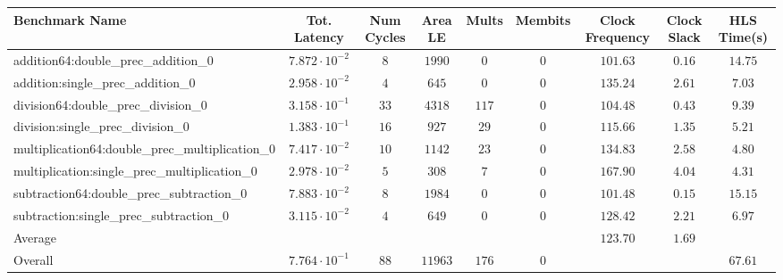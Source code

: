 \begin{tabular}{|l|c|c|c|c|c|c|c|c|}
\hline
Benchmark Name                                   & Tot. Latency            & Num Cycles & Area LE   & Mults   & Membits & Clock Frequency & Clock Slack & HLS Time(s) \\
\hline
addition64:double\_prec\_addition\_0             & $ 7.872 \cdot 10^{-2} $ & $ 8      $ & $ 1990  $ & $ 0   $ & $ 0   $ & $ 101.63      $ & $ 0.16    $ & $ 14.75   $ \\
addition:single\_prec\_addition\_0               & $ 2.958 \cdot 10^{-2} $ & $ 4      $ & $ 645   $ & $ 0   $ & $ 0   $ & $ 135.24      $ & $ 2.61    $ & $ 7.03    $ \\
division64:double\_prec\_division\_0             & $ 3.158 \cdot 10^{-1} $ & $ 33     $ & $ 4318  $ & $ 117 $ & $ 0   $ & $ 104.48      $ & $ 0.43    $ & $ 9.39    $ \\
division:single\_prec\_division\_0               & $ 1.383 \cdot 10^{-1} $ & $ 16     $ & $ 927   $ & $ 29  $ & $ 0   $ & $ 115.66      $ & $ 1.35    $ & $ 5.21    $ \\
multiplication64:double\_prec\_multiplication\_0 & $ 7.417 \cdot 10^{-2} $ & $ 10     $ & $ 1142  $ & $ 23  $ & $ 0   $ & $ 134.83      $ & $ 2.58    $ & $ 4.80    $ \\
multiplication:single\_prec\_multiplication\_0   & $ 2.978 \cdot 10^{-2} $ & $ 5      $ & $ 308   $ & $ 7   $ & $ 0   $ & $ 167.90      $ & $ 4.04    $ & $ 4.31    $ \\
subtraction64:double\_prec\_subtraction\_0       & $ 7.883 \cdot 10^{-2} $ & $ 8      $ & $ 1984  $ & $ 0   $ & $ 0   $ & $ 101.48      $ & $ 0.15    $ & $ 15.15   $ \\
subtraction:single\_prec\_subtraction\_0         & $ 3.115 \cdot 10^{-2} $ & $ 4      $ & $ 649   $ & $ 0   $ & $ 0   $ & $ 128.42      $ & $ 2.21    $ & $ 6.97    $ \\
\hline
Average                                          & $                     $ & $        $ & $       $ & $     $ & $     $ & $ 123.70      $ & $ 1.69    $ & $         $ \\
\hline
Overall                                          & $ 7.764 \cdot 10^{-1} $ & $ 88     $ & $ 11963 $ & $ 176 $ & $ 0   $ & $             $ & $         $ & $ 67.61   $ \\
\hline
\end{tabular}
